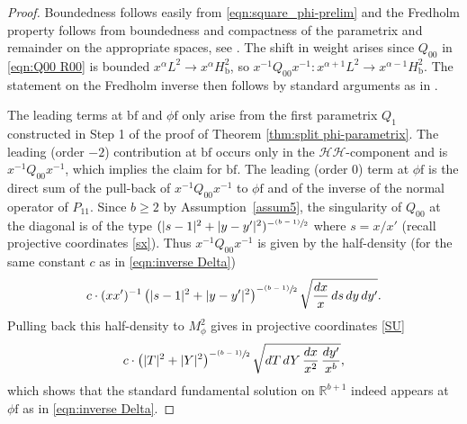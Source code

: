 \documentclass[JEP,XML,SOM,Unicode,NoFloatCountersInSection,published]{cedram}
\newcommand{\psfrac}[2]{\sfrac{(#1)}{#2}}
\theoremstyle{plain}
\theoremstyle{definition}
\newcommand{\R}{{\mathbb{R}}}
\newcommand{\phif}{{\phi\mathrm{f}}}
\newcommand{\bb}{{\mathrm{b}}}
\newcommand{\bbf}{{\mathrm{bf}}}
\begin{document}
\begin{proof}
Boundedness follows easily from \eqref{eqn:square_phi-prelim} and the Fredholm property follows from boundedness and compactness of the parametrix and remainder on the appropriate spaces, see \cite[Th.\,13]{grieser-para}. The shift in weight arises since $Q_{00}$ in \eqref{eqn:Q00 R00} is bounded $x^\alpha L^2\to x^\alpha H^2_\bb$, so $x^{-1}Q_{00}x^{-1}: x^{\alpha+1}L^2\to x^{\alpha-1}H^2_\bb$. The statement on the Fredholm inverse then follows by standard arguments as in
\cite[Prop.\,5.42 \& 5.64]{melrose1993atiyah}.

The leading terms at $\bbf$ and $\phif$ only arise from the first parametrix $Q_1$ constructed in Step 1 of the proof of Theorem \ref{thm:split phi-parametrix}. The leading (\ie order $-2$) contribution at $\bbf$ occurs only in the $\mathscr{H}\mathscr{H}$-component and is $x^{-1}Q_{00}x^{-1}$, which implies the claim for $\bbf$.
The leading (\ie order $0$) term at $\phif$ is the direct sum of the pull-back of $x^{-1}Q_{00}x^{-1}$ to $\phif$ and of the inverse of the normal operator of $P_{11}$. Since $b\geq2$ by Assumption~\ref{assum5}, the singularity of $Q_{00}$ at the diagonal is of the type $(|s-1|^2+|y-y'|^2)^{-\psfrac{b-1}2}$ where $s=x/x'$ (recall projective
coordinates \eqref{sx}). Thus $x^{-1}Q_{00}x^{-1}$ is given
by the half-density (for the same constant $c$ as in \eqref{eqn:inverse Delta})\vspace*{-3pt}
\[
c \cdot (xx')^{-1}\left(|s-1|^2+|y-y'|^2\right)^{-\psfrac{b-1}2} \sqrt{\frac{dx}x\, ds\, dy\,dy'}.
\]
Pulling back this half-density to $M^2_\phi$ gives in projective coordinates \eqref{SU}\vspace*{-3pt}
\[
c \cdot \left(|T|^2+|Y|^2\right)^{-\psfrac{b-1}2} \sqrt{dT\,dY\,\frac{dx}{x^2}\,\frac{dy'}{x^b}},
\]
which shows that the standard fundamental solution on $\R^{b+1}$
indeed appears at $\phif$ as in \eqref{eqn:inverse Delta}.
\end{proof}
\end{document}
